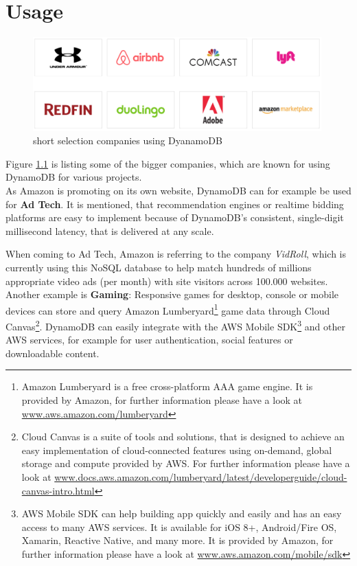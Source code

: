 \chapter{Usage}
\label{cha:Usage}

\begin{figure}[H]
\centering
	\includegraphics[width=0.99\textwidth]{images/customerstudies}
	\caption{short selection companies using DyanamoDB}
	\label{fig:usage}
\end{figure}

Figure \ref{fig:usage} is listing some of the bigger companies, which are known for using DynamoDB for various projects. \\

As Amazon is promoting on its own website, DynamoDB can for example be used for \textbf{Ad Tech}. It is mentioned, that recommendation engines or realtime bidding platforms are easy to implement because of DynamoDB's consistent, single-digit millisecond latency, that is delivered at any scale. 

When coming to Ad Tech, Amazon is referring to the company \textit{VidRoll}, which is currently using this NoSQL database to help match hundreds of millions appropriate video ads (per month) with site visitors across 100.000 websites.\cite{aws} \\

Another example is \textbf{Gaming}: Responsive games for desktop, console or mobile devices can store and query Amazon Lumberyard\footnote{Amazon Lumberyard is a free cross-platform AAA game engine. It is provided by Amazon, for further information please have a look at \href{https://aws.amazon.com/lumberyard/}{www.aws.amazon.com/lumberyard}} game data through Cloud Canvas\footnote{Cloud Canvas is a suite of tools and solutions, that is designed to achieve an easy implementation of cloud-connected features using on-demand, global storage and compute provided by AWS. For further information please have a look at \href{http://docs.aws.amazon.com/lumberyard/latest/developerguide/cloud-canvas-intro.html}{www.docs.aws.amazon.com/lumberyard/latest/developerguide/cloud-canvas-intro.html}}. DynamoDB can easily integrate with the AWS Mobile SDK\footnote{AWS Mobile SDK can help building app quickly and easily and has an easy access to many AWS services. It is available for iOS 8+, Android/Fire OS, Xamarin, Reactive Native, and many more. It is provided by Amazon, for further information please have a look at \href{https://aws.amazon.com/mobile/sdk/}{www.aws.amazon.com/mobile/sdk}} and other AWS services, for example for user authentication, social features or downloadable content.

